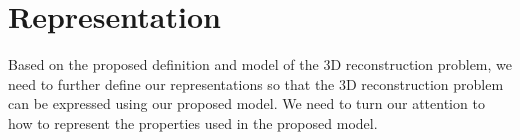 

\section{Representation}
\label{sec:3DRecon_Rep}
Based on the proposed definition and model of the 3D reconstruction problem, we need to further define our representations so that the 3D reconstruction problem can be expressed using our proposed model. We need to turn our attention to how to represent the properties used in the proposed model.





